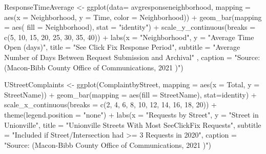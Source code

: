 \documentclass[
]{article}
\newenvironment{Shaded}{\begin{snugshade}}{\end{snugshade}}
\newcommand{\AttributeTok}[1]{\textcolor[rgb]{0.77,0.63,0.00}{#1}}
\newcommand{\DecValTok}[1]{\textcolor[rgb]{0.00,0.00,0.81}{#1}}
\newcommand{\FunctionTok}[1]{\textcolor[rgb]{0.00,0.00,0.00}{#1}}
\newcommand{\NormalTok}[1]{#1}
\newcommand{\OtherTok}[1]{\textcolor[rgb]{0.56,0.35,0.01}{#1}}
\newcommand{\SpecialCharTok}[1]{\textcolor[rgb]{0.00,0.00,0.00}{#1}}
\newcommand{\StringTok}[1]{\textcolor[rgb]{0.31,0.60,0.02}{#1}}
\begin{document}
\begin{Shaded}
\begin{Highlighting}[]
 
 
  
 
\NormalTok{ ResponseTimeAverage }\OtherTok{\textless{}{-}} \FunctionTok{ggplot}\NormalTok{(}\AttributeTok{data=}\NormalTok{ avgresponseneighborhood, }\AttributeTok{mapping =} \FunctionTok{aes}\NormalTok{(}\AttributeTok{x =}\NormalTok{ Neighborhood, }\AttributeTok{y =}\NormalTok{ Time, }\AttributeTok{color =}\NormalTok{ Neighborhood)) }\SpecialCharTok{+}
  \FunctionTok{geom\_bar}\NormalTok{(}\AttributeTok{mapping =} \FunctionTok{aes}\NormalTok{( }\AttributeTok{fill =}\NormalTok{ Neighborhood), }\AttributeTok{stat =} \StringTok{"identity"}\NormalTok{) }\SpecialCharTok{+} \FunctionTok{scale\_y\_continuous}\NormalTok{(}\AttributeTok{breaks =} \FunctionTok{c}\NormalTok{(}\DecValTok{5}\NormalTok{, }\DecValTok{10}\NormalTok{, }\DecValTok{15}\NormalTok{, }\DecValTok{20}\NormalTok{, }\DecValTok{25}\NormalTok{, }\DecValTok{30}\NormalTok{, }\DecValTok{35}\NormalTok{, }\DecValTok{40}\NormalTok{)) }\SpecialCharTok{+}
  \FunctionTok{labs}\NormalTok{(}\AttributeTok{x =} \StringTok{"Neighborhood"}\NormalTok{, }\AttributeTok{y =} \StringTok{"Average Time Open (days)"}\NormalTok{,}
     \AttributeTok{title =} \StringTok{"See Click Fix Response Period"}\NormalTok{,}
     \AttributeTok{subtitle =} \StringTok{"Average Number of Days Between Request Submission and Archival"}\NormalTok{ ,}
     \AttributeTok{caption =} \StringTok{"Source: (Macon{-}Bibb County Office of Communications, 2021 )"}\NormalTok{) }
 
 
\NormalTok{UStreetComplaints }\OtherTok{\textless{}{-}} \FunctionTok{ggplot}\NormalTok{(ComplaintbyStreet, }\AttributeTok{mapping =} \FunctionTok{aes}\NormalTok{(}\AttributeTok{x =}\NormalTok{ Total, }\AttributeTok{y =}\NormalTok{ StreetName)) }\SpecialCharTok{+} \FunctionTok{geom\_bar}\NormalTok{(}\AttributeTok{mapping =} \FunctionTok{aes}\NormalTok{(}\AttributeTok{fill =}\NormalTok{ StreetName), }\AttributeTok{stat=}\StringTok{\textquotesingle{}identity\textquotesingle{}}\NormalTok{)  }\SpecialCharTok{+} \FunctionTok{scale\_x\_continuous}\NormalTok{(}\AttributeTok{breaks =} \FunctionTok{c}\NormalTok{(}\DecValTok{2}\NormalTok{, }\DecValTok{4}\NormalTok{, }\DecValTok{6}\NormalTok{, }\DecValTok{8}\NormalTok{, }\DecValTok{10}\NormalTok{, }\DecValTok{12}\NormalTok{, }\DecValTok{14}\NormalTok{, }\DecValTok{16}\NormalTok{, }\DecValTok{18}\NormalTok{, }\DecValTok{20}\NormalTok{)) }\SpecialCharTok{+}
   \FunctionTok{theme}\NormalTok{(}\AttributeTok{legend.position =} \StringTok{"none"}\NormalTok{) }\SpecialCharTok{+}
  \FunctionTok{labs}\NormalTok{(}\AttributeTok{x =} \StringTok{"Requests by Street"}\NormalTok{, }\AttributeTok{y =} \StringTok{"Street in Unionville"}\NormalTok{,}
     \AttributeTok{title =} \StringTok{"Unionville Streets With Most SeeClickFix Requests"}\NormalTok{,}
     \AttributeTok{subtitle =} \StringTok{"Included if Street/Intersection had \textgreater{}= 3 Requests in 2020"}\NormalTok{,}
     \AttributeTok{caption =} \StringTok{"Source: (Macon{-}Bibb County Office of Communications, 2021 )"}\NormalTok{)  }
\end{Highlighting}
\end{Shaded}
\end{document}
